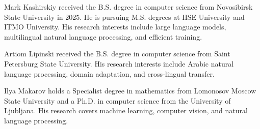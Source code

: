 \documentclass{ieeeaccess}
\begin{document}



\begin{IEEEbiographynophoto}{Mark Kashirskiy}
received the B.S. degree in computer science from Novosibirsk State
University in 2025. He is pursuing M.S. degrees at HSE University and ITMO
University. His research interests include large language models,
multilingual natural language processing, and efficient training.
\end{IEEEbiographynophoto}

\begin{IEEEbiographynophoto}{Artiom Lipinski}
received the B.S. degree in computer science from Saint Petersburg State
University. His research interests include Arabic natural language
processing, domain adaptation, and cross-lingual transfer.
\end{IEEEbiographynophoto}

\begin{IEEEbiographynophoto}{Ilya Makarov}
holds a Specialist degree in mathematics from Lomonosov Moscow State
University and a Ph.D. in computer science from the University of
Ljubljana. His research covers machine learning, computer vision, and
natural language processing.
\end{IEEEbiographynophoto}

\EOD
\end{document}
